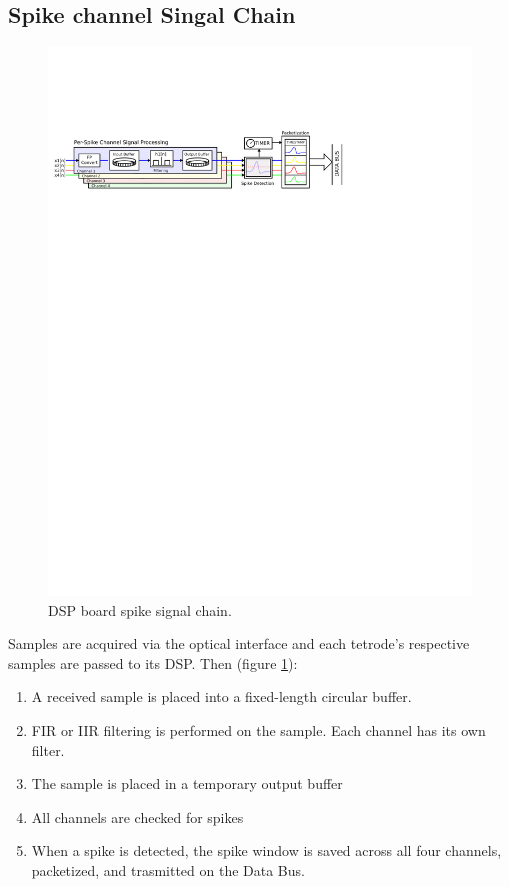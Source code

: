 \subsection{Spike channel Singal Chain}
\begin{figure}[h!]
\begin{center}
\includegraphics[scale=1.0]{spikesignal.svg}
\end{center}
\label{SpikeChain}
\caption{DSP board spike signal chain.}
\end{figure}

Samples are acquired via the optical interface and each tetrode's respective samples are passed to its DSP. Then (figure \ref{SpikeChain}): 

\begin{enumerate}
\item A received sample is placed into a fixed-length circular buffer. 
\item FIR or IIR filtering is performed on the sample. Each channel has its own filter. 
\item The sample is placed in a temporary output buffer
\item All channels are checked for spikes
\item When a spike is detected, the spike window is saved across all four channels, packetized, and trasmitted on the Data Bus. 
\end{enumerate}


